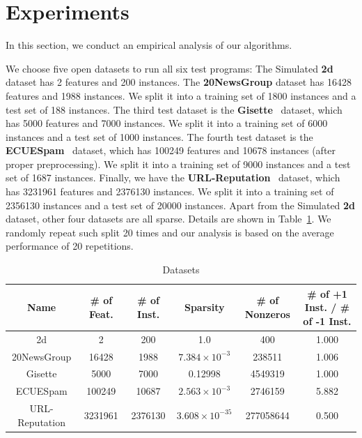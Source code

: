 \documentclass{llncs}
\begin{document}
\section{Experiments} \label{sec:experiment}
In this section, we conduct an empirical analysis of our algorithms.

We choose five open datasets to run all six test programs:	
The	Simulated \textbf{2d} dataset has 2 features and 200 instances.
The	\textbf{20NewsGroup} dataset has 16428 features and 1988 instances. We split it into a training set of 1800 instances and a test set of 188 instances.	
The	third test dataset is the \textbf{Gisette}~\cite{guyon2004result} dataset, which has 5000 features and 7000 instances. We split it into a training set of 6000 instances and a test set of 1000 instances.
The	fourth test dataset is the \textbf{ECUESpam}~\cite{DelanyKBS05} dataset, which has 100249 features and 10678 instances (after proper preprocessing). We split it into a training set of 9000 instances and a test set of 1687 instances.
Finally, we have the \textbf{URL-Reputation}~\cite{ma2009identifying} dataset, which has 3231961 features and 2376130 instances.
We split it into a training set of 2356130 instances and a test set of 20000 instances.
Apart from the Simulated \textbf{2d} dataset, other four datasets are all sparse. Details are shown in Table~\ref{tab:table1}.
We randomly repeat such split 20 times and our analysis is based on the average performance of 20 repetitions.


\begin{table}[h]
\centering
\caption{Datasets}\label{tab:table1}
\begin{tabular}{|c|c|c|c|c|c|}
\hline
    Name           & \# of Feat. & \# of Inst. & Sparsity & \# of Nonzeros & \# of +1 Inst. / \# of -1 Inst.\\
\hline
    2d             & 2             & 200            & 1.0                  & 400                 & 1.000 \\
\hline
    20NewsGroup    & 16428         & 1988           & $7.384\times10^{-3}$ & 238511              & 1.006 \\
\hline
    Gisette        & 5000          & 7000           & 0.12998              & 4549319             & 1.000 \\
\hline
    ECUESpam       & 100249        & 10687          & $2.563\times10^{-3}$ & 2746159             & 5.882 \\
\hline
    URL-Reputation & 3231961       & 2376130        & $3.608\times10^{-35}$ & 277058644           & 0.500 \\
\hline
\end{tabular}
\end{table}
\end{document}
